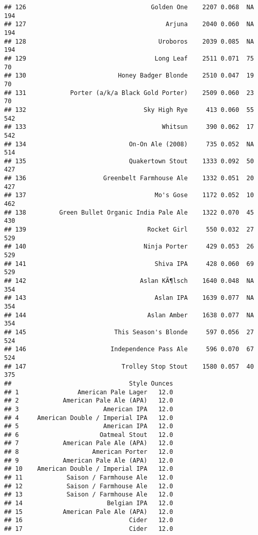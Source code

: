 \documentclass[
]{article}
\begin{document}
\begin{verbatim}
## 126                                  Golden One    2207 0.068  NA        194
## 127                                      Arjuna    2040 0.060  NA        194
## 128                                    Uroboros    2039 0.085  NA        194
## 129                                   Long Leaf    2511 0.071  75         70
## 130                         Honey Badger Blonde    2510 0.047  19         70
## 131            Porter (a/k/a Black Gold Porter)    2509 0.060  23         70
## 132                                Sky High Rye     413 0.060  55        542
## 133                                     Whitsun     390 0.062  17        542
## 134                            On-On Ale (2008)     735 0.052  NA        514
## 135                            Quakertown Stout    1333 0.092  50        427
## 136                     Greenbelt Farmhouse Ale    1332 0.051  20        427
## 137                                   Mo's Gose    1172 0.052  10        462
## 138         Green Bullet Organic India Pale Ale    1322 0.070  45        430
## 139                                 Rocket Girl     550 0.032  27        529
## 140                                Ninja Porter     429 0.053  26        529
## 141                                   Shiva IPA     428 0.060  69        529
## 142                               Aslan KÃ¶lsch    1640 0.048  NA        354
## 143                                   Aslan IPA    1639 0.077  NA        354
## 144                                 Aslan Amber    1638 0.077  NA        354
## 145                        This Season's Blonde     597 0.056  27        524
## 146                       Independence Pass Ale     596 0.070  67        524
## 147                          Trolley Stop Stout    1580 0.057  40        375
##                                Style Ounces
## 1                American Pale Lager   12.0
## 2            American Pale Ale (APA)   12.0
## 3                       American IPA   12.0
## 4     American Double / Imperial IPA   12.0
## 5                       American IPA   12.0
## 6                      Oatmeal Stout   12.0
## 7            American Pale Ale (APA)   12.0
## 8                    American Porter   12.0
## 9            American Pale Ale (APA)   12.0
## 10    American Double / Imperial IPA   12.0
## 11            Saison / Farmhouse Ale   12.0
## 12            Saison / Farmhouse Ale   12.0
## 13            Saison / Farmhouse Ale   12.0
## 14                       Belgian IPA   12.0
## 15           American Pale Ale (APA)   12.0
## 16                             Cider   12.0
## 17                             Cider   12.0

\end{verbatim}
\end{document}

